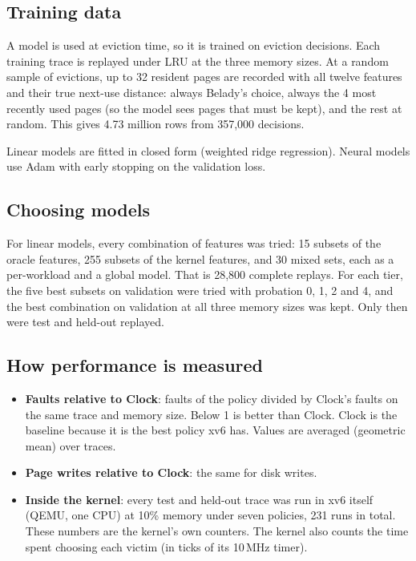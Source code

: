 \documentclass[10.5pt,a4paper]{article}
\begin{document}
\subsection{Training data}

A model is used at eviction time, so it is trained on eviction decisions.
Each training trace is replayed under LRU at the three memory sizes. At a
random sample of evictions, up to 32 resident pages are recorded with all
twelve features and their true next-use distance: always Belady's choice,
always the 4 most recently used pages (so the model sees pages that must be
kept), and the rest at random. This gives 4.73 million rows from 357,000
decisions.

Linear models are fitted in closed form (weighted ridge regression). Neural
models use Adam with early stopping on the validation loss.

\subsection{Choosing models}

For linear models, every combination of features was tried: 15 subsets of
the oracle features, 255 subsets of the kernel features, and 30 mixed sets,
each as a per-workload and a global model. That is 28,800 complete replays.
For each tier, the five best subsets on validation were tried with probation
0, 1, 2 and 4, and the best combination on validation at all three memory
sizes was kept. Only then were test and held-out replayed.

\subsection{How performance is measured}

\begin{itemize}
\item \textbf{Faults relative to Clock}: faults of the policy divided by
Clock's faults on the same trace and memory size. Below 1 is better than
Clock. Clock is the baseline because it is the best policy xv6 has. Values
are averaged (geometric mean) over traces.
\item \textbf{Page writes relative to Clock}: the same for disk writes.
\item \textbf{Inside the kernel}: every test and held-out trace was run in
xv6 itself (QEMU, one CPU) at 10\% memory under seven policies, 231 runs in
total. These numbers are the kernel's own counters. The kernel also counts the
time spent choosing each victim (in ticks of its 10\,MHz timer).
\end{itemize}
\end{document}
